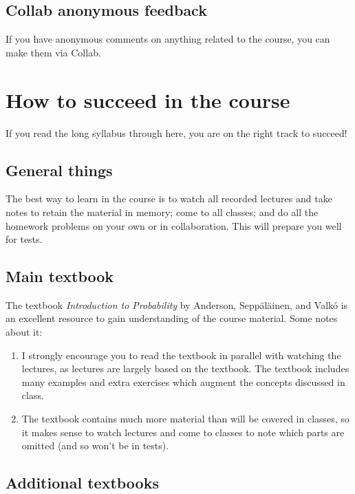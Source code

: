 \documentclass[oneside,11pt]{amsart}
\begin{document}
\subsection{Collab anonymous feedback}
\label{sub:collab}
If you have anonymous comments on anything related to the course, you can make
them via Collab.

\section{How to succeed in the course}
\label{success}

If you read the long syllabus through here, you are on the right
track to succeed!

\subsection{General things}

The best way to learn in the course is to 
watch all recorded lectures and take notes to retain the material in memory; 
come to all classes;
and do all the homework problems on your own or in collaboration.
This will prepare you well for tests.

\subsection{Main textbook}

The textbook \emph{Introduction to Probability} by Anderson, Sepp\"al\"ainen, and Valk\'o 
is 
an excellent resource 
to gain understanding of the course material. Some notes about it:

\begin{enumerate}[$\bullet$]
	\item I strongly encourage you to read the textbook in parallel with watching the lectures, as lectures are largely based on the textbook.
		The textbook includes many examples and
		extra exercises which augment the concepts discussed in class.
	\item The textbook contains much more material than will be covered in classes, so it
		makes sense to watch lectures and come to classes to note which parts are omitted
		(and so won't be in tests).
\end{enumerate}

\subsection{Additional textbooks}
\end{document}
